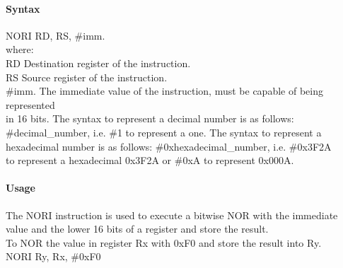 \documentclass[12pt]{article}
\begin{document}
    \paragraph{Syntax}
    \begin{flushleft}
    NORI RD, RS, \#imm.\\
    \vspace{1em}        %
    where:\\
    \vspace{1em}
    RD  \hspace{3.6em} Destination register of the instruction.\\
    \vspace{1em}
    RS  \hspace{3.85em} Source register of the instruction.\\
    \vspace{1em}
    \#imm.  \hspace{1.8em} The immediate value of the instruction, must be capable of being represented\\             \hspace{5.4em} in 16 bits. The syntax to represent a decimal number is as follows:\\
            \hspace{5.4em} \#decimal\_number, i.e. \#1 to represent a one. The syntax to represent a\\
            \hspace{5.4em} hexadecimal number is as follows: \#0xhexadecimal\_number, i.e. \#0x3F2A \\
            \hspace{5.4em} to represent a hexadecimal 0x3F2A or \#0xA to represent 0x000A.\\
    \end{flushleft}
    
    \paragraph{Usage}
    \begin{flushleft}
    The NORI instruction is used to execute a bitwise NOR with the immediate value and the lower 16 bits of a register and store the result.\\    
    \vspace{1em}
    To NOR the value in register Rx with 0xF0 and store the result into Ry.\\
    \vspace{1em}
    NORI Ry, Rx, \#0xF0
    \end{flushleft}
    
\end{document}
